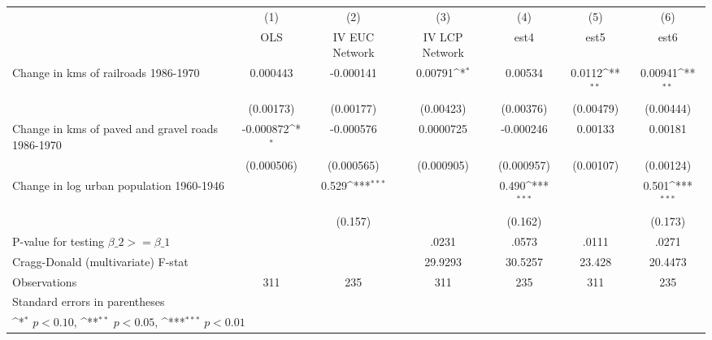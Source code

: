 {
\def\sym#1{\ifmmode^{#1}\else\(^{#1}\)\fi}
\begin{tabular}{l*{6}{c}}
\hline\hline
                &\multicolumn{1}{c}{(1)}&\multicolumn{1}{c}{(2)}&\multicolumn{1}{c}{(3)}&\multicolumn{1}{c}{(4)}&\multicolumn{1}{c}{(5)}&\multicolumn{1}{c}{(6)}\\
                &\multicolumn{1}{c}{OLS}&\multicolumn{1}{c}{IV EUC Network}&\multicolumn{1}{c}{IV LCP Network}&\multicolumn{1}{c}{est4}&\multicolumn{1}{c}{est5}&\multicolumn{1}{c}{est6}\\
\hline
Change in kms of railroads 1986-1970& 0.000443         &-0.000141         &  0.00791\sym{*}  &  0.00534         &   0.0112\sym{**} &  0.00941\sym{**} \\
                &(0.00173)         &(0.00177)         &(0.00423)         &(0.00376)         &(0.00479)         &(0.00444)         \\
[1em]
Change in kms of paved and gravel roads 1986-1970&-0.000872\sym{*}  &-0.000576         &0.0000725         &-0.000246         &  0.00133         &  0.00181         \\
                &(0.000506)         &(0.000565)         &(0.000905)         &(0.000957)         &(0.00107)         &(0.00124)         \\
[1em]
Change in log urban population 1960-1946&                  &    0.529\sym{***}&                  &    0.490\sym{***}&                  &    0.501\sym{***}\\
                &                  &  (0.157)         &                  &  (0.162)         &                  &  (0.173)         \\
\hline
P-value for testing $\beta\_{2} >= \beta\_{1}$&                  &                  &    .0231         &    .0573         &    .0111         &    .0271         \\
Cragg-Donald (multivariate) F-stat&                  &                  &  29.9293         &  30.5257         &   23.428         &  20.4473         \\
Observations    &      311         &      235         &      311         &      235         &      311         &      235         \\
\hline\hline
\multicolumn{7}{l}{\footnotesize Standard errors in parentheses}\\
\multicolumn{7}{l}{\footnotesize \sym{*} \(p<0.10\), \sym{**} \(p<0.05\), \sym{***} \(p<0.01\)}\\
\end{tabular}
}
